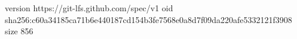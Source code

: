 version https://git-lfs.github.com/spec/v1
oid sha256:c60a34185ca71b6e440187cd154b3fe7568e0a8d7f09da220afe5332121f3908
size 856

